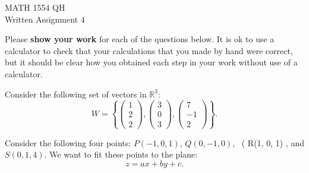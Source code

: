 \documentclass[11pt]{exam}
\begin{document}
\begin{center}
\Large MATH 1554 QH \\[2pt] Written Assignment 4
\end{center}
\thispagestyle{empty} %
\noindent Please \textbf{show your work} for each of the questions below. It is
ok to use a calculator to check that your calculations that you made by hand were
correct, but it should be clear how you obtained each step in your work without use
of a calculator.
\begin{questions}
\question[5]
Consider the following set of vectors in $\mathbb{R}^3$:
\[
W = \left\{ \begin{pmatrix} 1 \\ 2 \\ 2 \end{pmatrix}, \begin{pmatrix} 3 \\
0 \\ 3 \end{pmatrix}, \begin{pmatrix} 7 \\ -1 \\ 2 \end{pmatrix} \right\}.
\]
\question[5]
Consider the following four points: \( P(-1, 0, 1) \), \(Q (0, -1, 0) \), \
( R(1, 0, 1) \), and \( S(0, 1, 4) \). We want to fit these points to the plane:
\[
z = ax + by + c.
\]
\begin{parts}

\end{parts}
\end{questions}
\end{document}
